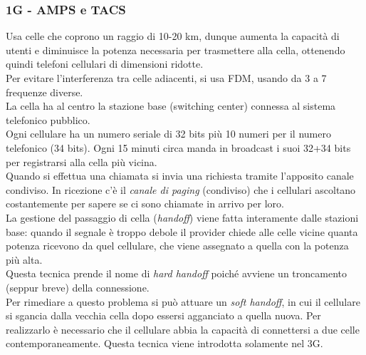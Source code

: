 \documentclass[10pt,a4paper,twoside]{article}
\begin{document}
\subsubsection{1G - AMPS e TACS}
Usa celle che coprono un raggio di 10-20 km, dunque aumenta la capacità di utenti e diminuisce la potenza necessaria per trasmettere alla cella, ottenendo quindi telefoni cellulari di dimensioni ridotte.\\
Per evitare l'interferenza tra celle adiacenti, si usa FDM, usando da 3 a 7 frequenze diverse.\\
La cella ha al centro la stazione base (switching center) connessa al sistema telefonico pubblico.\\
Ogni cellulare ha un numero seriale di 32 bits più 10 numeri per il numero telefonico (34 bits). Ogni 15 minuti circa manda in broadcast i suoi 32+34 bits per registrarsi alla cella più vicina.\\
Quando si effettua una chiamata si invia una richiesta tramite l'apposito canale condiviso. In ricezione c'è il \textit{canale di paging} (condiviso) che i cellulari ascoltano costantemente per sapere se ci sono chiamate in arrivo per loro.\\
La gestione del passaggio di cella (\textit{handoff}) viene fatta interamente dalle stazioni base: quando il segnale è troppo debole il provider chiede alle celle vicine quanta potenza ricevono da quel cellulare, che viene assegnato a quella con la potenza più alta.\\
Questa tecnica prende il nome di \textit{hard handoff} poiché avviene un troncamento (seppur breve) della connessione.\\
Per rimediare a questo problema si può attuare un \textit{soft handoff}, in cui il cellulare si sgancia dalla vecchia cella dopo essersi agganciato a quella nuova. Per realizzarlo è necessario che il cellulare abbia la capacità di connettersi a due celle contemporaneamente. Questa tecnica viene introdotta solamente nel 3G.
\end{document}
